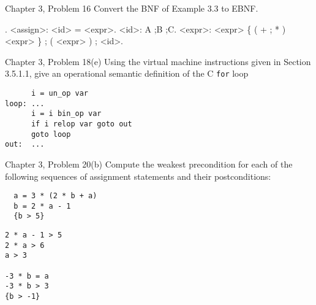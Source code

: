 \documentclass[11pt]{article}
\begin{document}
\begin{ps}
\begin{problemcit}{Chapter 3, Problem 16} Convert the BNF of Example 3.3 to EBNF.\end{problemcit}
\begin{soln}

  \vspace{-4ex}\mbox{}.
  <assign>: <id> = <expr>.
  <id>: A ;B ;C.
  <expr>: <expr> \{ ( + ; * ) <expr> \} ; ( <expr> ) ; <id>.
  \end{grammar}
\end{soln}
\end{ps}

\begin{ps}
\begin{problemcit}{Chapter 3, Problem 18(e)} Using the virtual machine instructions given in Section 3.5.1.1, give an operational semantic definition of the C \verb|for| loop\end{problemcit}
\begin{soln}
\begin{verbatim}
      i = un_op var
loop: ...
      i = i bin_op var
      if i relop var goto out
      goto loop
out:  ...
\end{verbatim}
\end{soln}
\end{ps}

\begin{ps}
\begin{problemcit}{Chapter 3, Problem 20(b)} Compute the weakest precondition for each of the following sequences of assignment statements and their postconditions:
\begin{verbatim}
  a = 3 * (2 * b + a)
  b = 2 * a - 1
  {b > 5}
\end{verbatim}
\end{problemcit}
\begin{soln}
\begin{verbatim}
2 * a - 1 > 5
2 * a > 6
a > 3

-3 * b = a
-3 * b > 3
{b > -1}
\end{verbatim}
\end{soln}
\end{ps}
\end{document}
